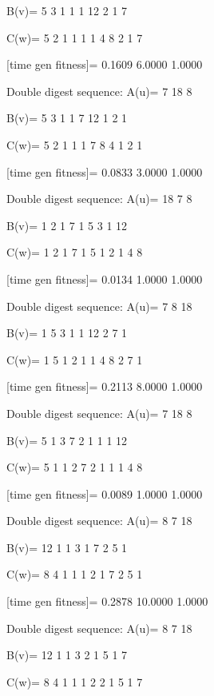 B(v)=
     5     3     1     1     1    12     2     1     7

C(w)=
     5     2     1     1     1     1     4     8     2     1     7

[time gen fitness]=
    0.1609    6.0000    1.0000

Double digest sequence:
A(u)=
     7    18     8

B(v)=
     5     3     1     1     7    12     1     2     1

C(w)=
     5     2     1     1     1     7     8     4     1     2     1

[time gen fitness]=
    0.0833    3.0000    1.0000

Double digest sequence:
A(u)=
    18     7     8

B(v)=
     1     2     1     7     1     5     3     1    12

C(w)=
     1     2     1     7     1     5     1     2     1     4     8

[time gen fitness]=
    0.0134    1.0000    1.0000

Double digest sequence:
A(u)=
     7     8    18

B(v)=
     1     5     3     1     1    12     2     7     1

C(w)=
     1     5     1     2     1     1     4     8     2     7     1

[time gen fitness]=
    0.2113    8.0000    1.0000

Double digest sequence:
A(u)=
     7    18     8

B(v)=
     5     1     3     7     2     1     1     1    12

C(w)=
     5     1     1     2     7     2     1     1     1     4     8

[time gen fitness]=
    0.0089    1.0000    1.0000

Double digest sequence:
A(u)=
     8     7    18

B(v)=
    12     1     1     3     1     7     2     5     1

C(w)=
     8     4     1     1     1     2     1     7     2     5     1

[time gen fitness]=
    0.2878   10.0000    1.0000

Double digest sequence:
A(u)=
     8     7    18

B(v)=
    12     1     1     3     2     1     5     1     7

C(w)=
     8     4     1     1     1     2     2     1     5     1     7

